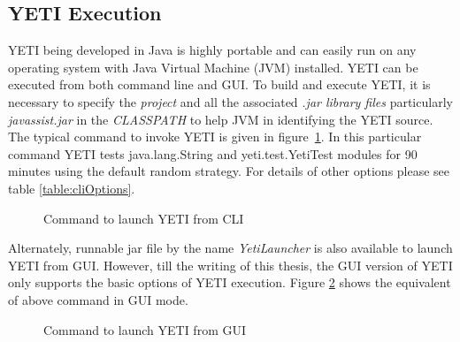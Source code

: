 \subsection{YETI Execution}
YETI being developed in Java is highly portable and can easily run on any operating system with Java Virtual Machine (JVM) installed. YETI can be executed from both command line and GUI. To build and execute YETI, it is necessary to specify the {\it project} and all the associated {\it .jar library files} particularly {\it javassist.jar} in the {\it CLASSPATH} to help JVM in identifying the YETI source. The typical command to invoke YETI is given in figure~\ref{fig:yeticommand}. In this particular command YETI tests java.lang.String and yeti.test.YetiTest modules for 90 minutes using the default random strategy. For details of other options please see table \ref{table:cliOptions}. 

\begin{figure}[h]
	\centering
	\caption{Command to launch YETI from CLI}
	\label{fig:yeticommand}
\end{figure}

Alternately, runnable jar file by the name {\it YetiLauncher} is also available to launch YETI from GUI. However, till the writing of this thesis, the GUI version of YETI only supports the basic options of YETI execution. Figure \ref{fig:yetiLauncher} shows the equivalent of above command in GUI mode.

\begin{figure}[h]
	\centering
	\caption{Command to launch YETI from GUI}
	\label{fig:yetiLauncher}
\end{figure}


